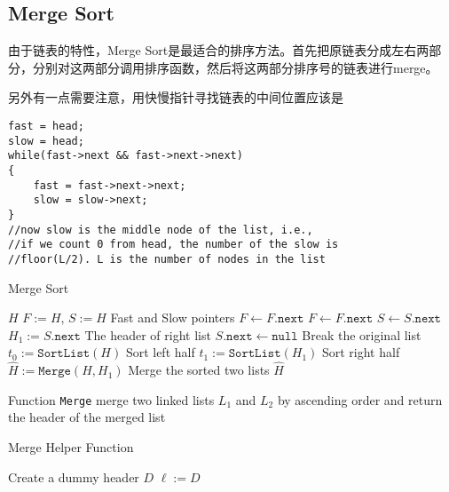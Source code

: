 \subsection{Merge Sort}
由于链表的特性，Merge Sort是最适合的排序方法。首先把原链表分成左右两部分，分别对这两部分调用排序函数，然后将这两部分排序号的链表进行merge。
\par
另外有一点需要注意，用快慢指针寻找链表的中间位置应该是
\begin{lstlisting}[style=customc]
fast = head;
slow = head;
while(fast->next && fast->next->next)
{
    fast = fast->next->next;
    slow = slow->next;
}
//now slow is the middle node of the list, i.e.,  
//if we count 0 from head, the number of the slow is
//floor(L/2). L is the number of nodes in the list
\end{lstlisting}
\setcounter{algorithm}{0}
\begin{algorithm}[H]
\caption{Merge Sort}
\begin{algorithmic}[1]
\State \Return $H$
\EndIf
\State $F:=H$, $S:=H$ \Comment Fast and Slow pointers
\State $F\gets F.\texttt{next}$
\State $F\gets F.\texttt{next}$
\State $S\gets S.\texttt{next}$
\EndWhile
\State $H_1:=S.\texttt{next}$ \Comment The header of right list
\State $S.\texttt{next}\gets\texttt{null}$ \Comment Break the original list
\State $t_0:=\texttt{SortList}(H)$ \Comment Sort left half
\State $t_1:=\texttt{SortList}(H_1)$ \Comment Sort right half
\State $\hat{H}:=\texttt{Merge}(H, H_1)$ \Comment Merge the sorted two lists
\State \Return $\hat{H}$
\EndProcedure
\end{algorithmic}
\end{algorithm}
Function \texttt{Merge} merge two linked lists $L_1$ and $L_2$ by ascending order and return the header of the merged list
\begin{algorithm}[H]
\caption{Merge Helper Function}
\begin{algorithmic}[1]
\State Create a dummy header $D$
\State $\ell:=D$
\end{algorithmic}
\end{algorithm}
